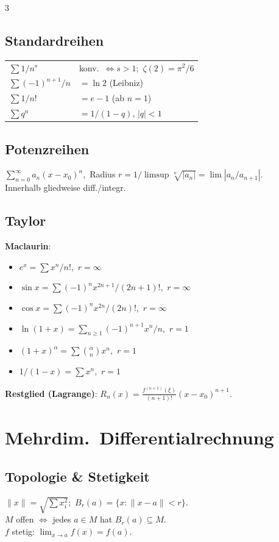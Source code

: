 \documentclass[8pt,a4paper]{extarticle}
\begin{document}
\begin{multicols*}{3}
\subsection{Standardreihen}
\begin{tabularx}{\linewidth}{@{}l@{\ }X@{}}
$\sum 1/n^s$ & konv.\ $\Leftrightarrow s>1$;\ $\zeta(2){=}\pi^2/6$ \\
$\sum(-1)^{n+1}/n$ & $=\ln 2$ (Leibniz) \\
$\sum 1/n!$ & $=e-1$ (ab $n{=}1$) \\
$\sum q^n$ & $=1/(1-q)$, $|q|<1$ \\
\end{tabularx}

\subsection{Potenzreihen}
$\sum_{n=0}^\infty a_n(x-x_0)^n$,\ Radius $r=1/\limsup\sqrt[n]{|a_n|}=\lim|a_n/a_{n+1}|$.\\
Innerhalb gliedweise diff./integr.

\subsection{Taylor}
\textbf{Maclaurin}:
\begin{itemize}
\item $e^x=\sum x^n/n!$,\ $r=\infty$
\item $\sin x=\sum (-1)^n x^{2n+1}/(2n{+}1)!$,\ $r=\infty$
\item $\cos x=\sum (-1)^n x^{2n}/(2n)!$,\ $r=\infty$
\item $\ln(1{+}x)=\sum_{n\ge 1}(-1)^{n+1}x^n/n$,\ $r=1$
\item $(1{+}x)^\alpha=\sum\binom{\alpha}{n}x^n$,\ $r=1$
\item $1/(1{-}x)=\sum x^n$,\ $r=1$
\end{itemize}
\textbf{Restglied (Lagrange)}: $R_n(x)=\tfrac{f^{(n+1)}(\xi)}{(n+1)!}(x{-}x_0)^{n+1}$.

\section{Mehrdim.\ Differentialrechnung}
\subsection{Topologie \& Stetigkeit}
$\|x\|=\sqrt{\sum x_i^2}$;\ $B_r(a)=\{x:\|x-a\|<r\}$.\\
$M$ offen $\Leftrightarrow$ jedes $a\!\in\!M$ hat $B_r(a)\!\subseteq\!M$.\\
$f$ stetig: $\lim_{x\to a}f(x)=f(a)$.


\end{multicols*}
\end{document}
